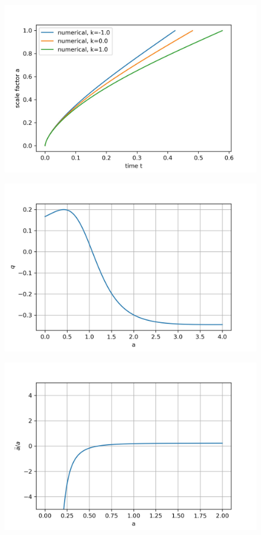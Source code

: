 \documentclass[a4paper, 11pt]{FSKH_623_Report}
\numberwithin{equation}{section}
\begin{document}
\begin{figure}[H]
\centering
\includegraphics[scale=1]{Figures/UDF_a_vs_t.jpg}
\caption{ }
\end{figure}

\begin{figure}[H]
\centering
\includegraphics[scale=1]{Figures/UDF_q.jpg}
\caption{}
\end{figure}

\begin{figure}[H]
\centering
\includegraphics[scale=1]{Figures/UDF_addot.jpg}
\caption{}
\end{figure}
\end{document}
